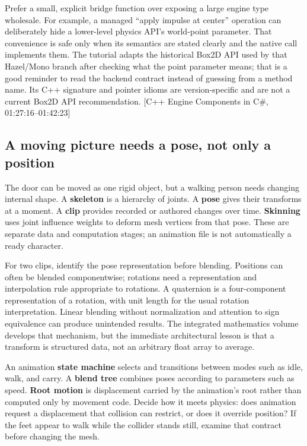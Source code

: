 Prefer a small, explicit bridge function over exposing a large engine type wholesale. For example, a managed ``apply impulse at center'' operation can deliberately hide a lower-level physics API's world-point parameter. That convenience is safe only when its semantics are stated clearly and the native call implements them. The tutorial adapts the historical Box2D API used by that Hazel/Mono branch after checking what the point parameter means; that is a good reminder to read the backend contract instead of guessing from a method name. Its C++ signature and pointer idioms are version-specific and are not a current Box2D API recommendation. {[}C++ Engine Components in C\#, 01:27:16--01:42:23{]}

\subsection{A moving picture needs a pose, not only a position}\label{06-engine-ii-ch040-a-moving-picture-needs-a-pose-not-only-a-position}

\hypertarget{06-engine-ii-ch040-a-moving-picture-needs-a-pose-not-only-a-position}{}

The door can be moved as one rigid object, but a walking person needs changing internal shape. A \textbf{skeleton} is a hierarchy of joints. A \textbf{pose} gives their transforms at a moment. A \textbf{clip} provides recorded or authored changes over time. \textbf{Skinning} uses joint influence weights to deform mesh vertices from that pose. These are separate data and computation stages; an animation file is not automatically a ready character.

For two clips, identify the pose representation before blending. Positions can often be blended componentwise; rotations need a representation and interpolation rule appropriate to rotations. A quaternion is a four-component representation of a rotation, with unit length for the usual rotation interpretation. Linear blending without normalization and attention to sign equivalence can produce unintended results. The integrated mathematics volume develops that mechanism, but the immediate architectural lesson is that a transform is structured data, not an arbitrary float array to average.

An animation \textbf{state machine} selects and transitions between modes such as idle, walk, and carry. A \textbf{blend tree} combines poses according to parameters such as speed. \textbf{Root motion} is displacement carried by the animation's root rather than computed only by movement code. Decide how it meets physics: does animation request a displacement that collision can restrict, or does it override position? If the feet appear to walk while the collider stands still, examine that contract before changing the mesh.

